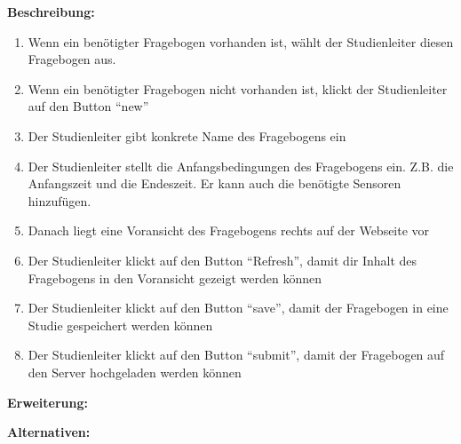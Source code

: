 \documentclass[a4paper]{scrreprt}
\begin{document}
\begin{itemize}
                \par \textbf{Beschreibung: }
                \begin{enumerate}
                    \item Wenn ein benötigter Fragebogen vorhanden ist, wählt der \gls{Studienleiter} diesen Fragebogen aus.
                    \item Wenn ein benötigter Fragebogen nicht vorhanden ist, klickt der \gls{Studienleiter} auf den Button ``new''
                    \item Der \gls{Studienleiter} gibt konkrete Name des Fragebogens ein
                    \item Der \gls{Studienleiter} stellt die Anfangsbedingungen des Fragebogens ein. Z.B. die Anfangszeit und die Endeszeit. Er kann auch die benötigte Sensoren hinzufügen.
                    \item Danach liegt eine Voransicht des Fragebogens rechts auf der Webseite vor
                    \item  Der \gls{Studienleiter} klickt auf den Button ``Refresh'', damit dir Inhalt des Fragebogens in den Voransicht gezeigt werden können
                    \item Der \gls{Studienleiter} klickt auf den Button ``save'', damit der Fragebogen in eine Studie gespeichert werden können
                    \item Der \gls{Studienleiter} klickt auf den Button ``submit'', damit der Fragebogen auf den Server hochgeladen werden können
                \end{enumerate}
                \par \textbf{Erweiterung: }
                \par \textbf{Alternativen: }
                \begin{figure}[H]
                    \centering

\end{figure}
\end{itemize}
\end{document}
